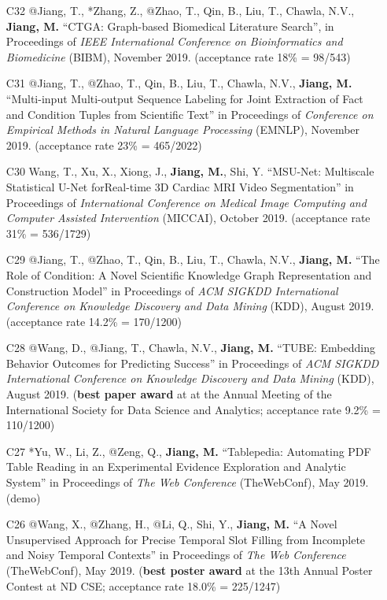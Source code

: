 \documentclass[10pt]{article}
\newenvironment{myindentpar}[1]%
{\begin{list}{}%
         {\setlength{\leftmargin}{#1}}%
         \item[]%
}
{\end{list}}
\newcounter{list}
\begin{document}
\begin{myindentpar}{0.00cm}
\begin{enumerate}[leftmargin=.5cm]
\item[C32] @Jiang, T., *Zhang, Z., @Zhao, T., Qin, B., Liu, T., Chawla, N.V., \textbf{Jiang, M.} ``CTGA: Graph-based Biomedical Literature Search'', in Proceedings of \textit{IEEE International Conference on Bioinformatics and Biomedicine} (BIBM), November 2019. (acceptance rate 18\% = 98/543)

\item[C31] @Jiang, T., @Zhao, T., Qin, B., Liu, T., Chawla, N.V., \textbf{Jiang, M.} ``Multi-input Multi-output Sequence Labeling for Joint Extraction of Fact and Condition Tuples from Scientific Text'' in Proceedings of \textit{Conference on Empirical Methods in Natural Language Processing} (EMNLP), November 2019. (acceptance rate 23\% = 465/2022)

\item[C30] Wang, T., Xu, X., Xiong, J., \textbf{Jiang, M.}, Shi, Y. ``MSU-Net: Multiscale Statistical U-Net forReal-time 3D Cardiac MRI Video Segmentation'' in Proceedings of \textit{International Conference on Medical Image Computing and Computer Assisted Intervention} (MICCAI), October 2019. (acceptance rate 31\% = 536/1729)

\item[C29] @Jiang, T., @Zhao, T., Qin, B., Liu, T., Chawla, N.V., \textbf{Jiang, M.} ``The Role of Condition: A Novel Scientific Knowledge Graph Representation and Construction Model'' in Proceedings of \textit{ACM SIGKDD International Conference on Knowledge Discovery and Data Mining} (KDD), August 2019. (acceptance rate 14.2\% = 170/1200)

\item[C28] @Wang, D., @Jiang, T., Chawla, N.V., \textbf{Jiang, M.} ``TUBE: Embedding Behavior Outcomes for Predicting Success'' in Proceedings of \textit{ACM SIGKDD International Conference on Knowledge Discovery and Data Mining} (KDD), August 2019. (\textbf{best paper award} at at the Annual Meeting of the International Society for Data Science and Analytics; acceptance rate 9.2\% = 110/1200)
	
\item[C27] *Yu, W., Li, Z., @Zeng, Q., \textbf{Jiang, M.} ``Tablepedia: Automating PDF Table Reading in an Experimental Evidence Exploration and Analytic System'' in Proceedings of \textit{The Web Conference} (TheWebConf), May 2019. (demo)
	
\item[C26] @Wang, X., @Zhang, H., @Li, Q., Shi, Y., \textbf{Jiang, M.} ``A Novel Unsupervised Approach for Precise Temporal Slot Filling from Incomplete and Noisy Temporal Contexts'' in Proceedings of \textit{The Web Conference} (TheWebConf), May 2019. (\textbf{best poster award} at the 13th Annual Poster Contest at ND CSE; acceptance rate 18.0\% = 225/1247)


\end{enumerate}
\end{myindentpar}
\end{document}

